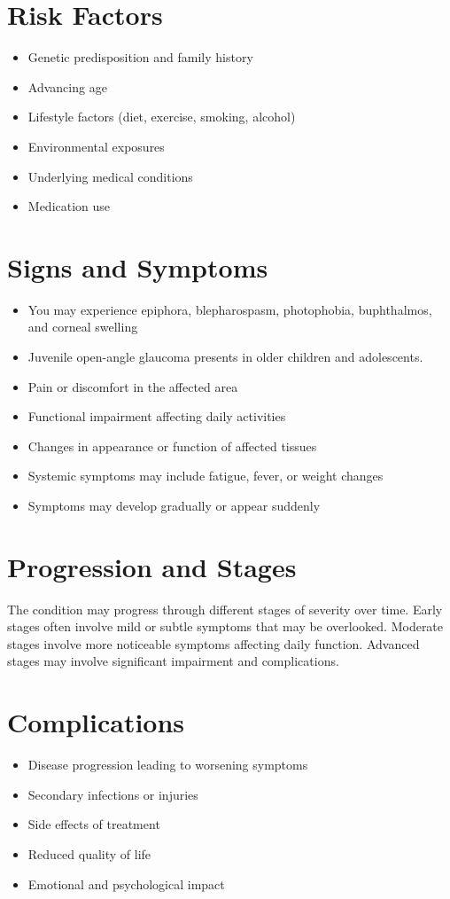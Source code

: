 \section{Risk Factors}
\begin{itemize}[noitemsep]
  \item Genetic predisposition and family history
  \item Advancing age
  \item Lifestyle factors (diet, exercise, smoking, alcohol)
  \item Environmental exposures
  \item Underlying medical conditions
  \item Medication use
\end{itemize}
\section{Signs and Symptoms}
\begin{itemize}[noitemsep]
  \item You may experience epiphora, blepharospasm, photophobia, buphthalmos, and corneal swelling
  \item Juvenile open-angle glaucoma presents in older children and adolescents.
  \item Pain or discomfort in the affected area
  \item Functional impairment affecting daily activities
  \item Changes in appearance or function of affected tissues
  \item Systemic symptoms may include fatigue, fever, or weight changes
  \item Symptoms may develop gradually or appear suddenly
\end{itemize}
\section{Progression and Stages}
The condition may progress through different stages of severity over time. Early stages often involve mild or subtle symptoms that may be overlooked. Moderate stages involve more noticeable symptoms affecting daily function. Advanced stages may involve significant impairment and complications.
\section{Complications}
\begin{itemize}[noitemsep]
  \item Disease progression leading to worsening symptoms
  \item Secondary infections or injuries
  \item Side effects of treatment
  \item Reduced quality of life
  \item Emotional and psychological impact
\end{itemize}
